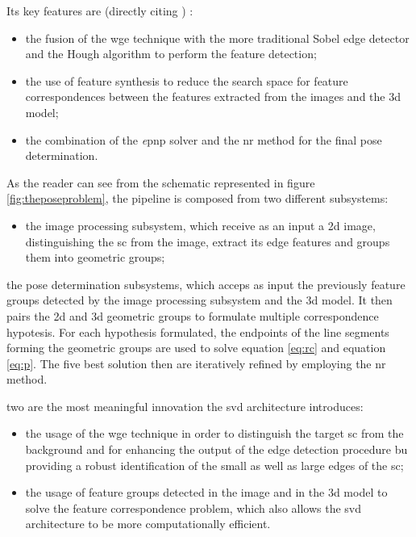Its key features are (directly citing \cite{Sharma2018})  :
\begin{itemize}
  \item the fusion of the \acrshort{wge} technique with the more traditional Sobel edge detector and the Hough algorithm to perform the feature detection;
  \item the use of feature synthesis to reduce the search space for feature correspondences between the features extracted from the images and the \acrshort{3d} model;
  \item the combination of the \textit{e}\acrshort{pnp} solver and the \acrfull{nr} method for the final pose determination.
\end{itemize}

As the reader can see from the schematic represented in figure \ref{fig:theposeproblem}, the pipeline is composed from two different subsystems:
\begin{itemize}
  \item the image processing subsystem, which receive as an input a \acrshort{2d} image, distinguishing the \acrshort{sc} from the image, extract its edge features and groups them into geometric groups;
\end{itemize} the pose determination subsystems, which acceps as input the previously feature groups detected by the image processing subsystem and the \acrshort{3d} model. It then pairs the \acrshort{2d} and \acrshort{3d} geometric groups to formulate multiple correspondence hypotesis. For each hypothesis formulated, the endpoints of the line segments forming the geometric groups are used to solve equation \eqref{eq:rc} and equation \eqref{eq:p}. The five best solution then are iteratively refined by employing the \acrshort{nr} method.

two are the most meaningful innovation the \acrshort{svd} architecture introduces:
\begin{itemize}
  \item the usage of the \acrshort{wge} technique in order to distinguish the target \acrshort{sc} from the background and for enhancing the output of the edge detection procedure bu providing a robust identification of the small as well as large edges of the \acrshort{sc};
  \item the usage of feature groups detected in the image and in the \acrshort{3d} model to solve the feature correspondence problem, which also allows the \acrshort{svd} architecture to be more computationally efficient.
\end{itemize}

